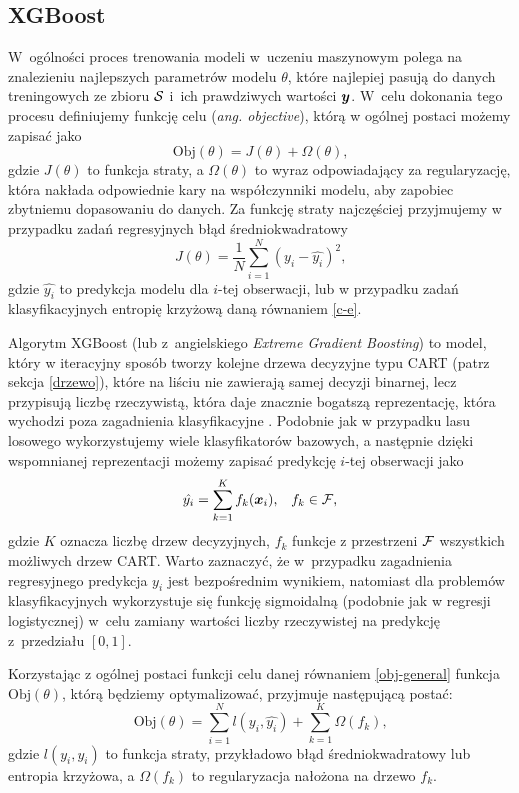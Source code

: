 \documentclass[inzynierska]{pwr_wmat_praca_dyplomowa}
\theoremstyle{plain}
\numberwithin{theorem}{chapter}
\theoremstyle{definition}
\numberwithin{theorem}{chapter}
\begin{document}
\subsection{XGBoost}
W~ogólności proces trenowania modeli w~uczeniu maszynowym polega na znalezieniu najlepszych parametrów modelu $\theta$, które najlepiej pasują do danych treningowych ze zbioru $\mathcal{S}$ i~ich prawdziwych wartości $\boldsymbol{y}$. W~celu dokonania tego procesu definiujemy funkcję celu (\textit{ang. objective}), którą w ogólnej postaci możemy zapisać jako
\begin{equation}
	\label{obj-general}
	\text{Obj}(\theta) = J(\theta) + \Omega(\theta) \text{,}
\end{equation}
gdzie $J(\theta)$ to funkcja straty, a $\Omega(\theta)$ to wyraz odpowiadający za regularyzację, która nakłada odpowiednie kary na współczynniki modelu, aby zapobiec zbytniemu dopasowaniu do danych. Za funkcję straty najczęściej przyjmujemy w przypadku zadań regresyjnych błąd średniokwadratowy
$$ J(\theta) = \frac{1}{N} \sum_{i=1}^{N} (y_i - \hat{y_i})^2 \text{,}$$
gdzie $\hat{y_i}$ to predykcja modelu dla $i$-tej obserwacji, lub w przypadku zadań klasyfikacyjnych entropię krzyżową daną równaniem \ref{c-e}.

Algorytm XGBoost (lub z~angielskiego \textit{Extreme Gradient Boosting}) to model, który w iteracyjny sposób tworzy kolejne drzewa decyzyjne typu CART (patrz sekcja \ref{drzewo}), które na liściu nie zawierają samej decyzji binarnej, lecz przypisują liczbę rzeczywistą, która daje znacznie bogatszą reprezentację, która wychodzi poza zagadnienia klasyfikacyjne \cite{xgboost}. Podobnie jak w przypadku lasu losowego wykorzystujemy wiele klasyfikatorów bazowych, a następnie dzięki wspomnianej reprezentacji możemy zapisać predykcję $i$-tej obserwacji jako
$$ \hat{y_i} = \sum_{k=1}^K f_k(\boldsymbol{x}_i) \text{,} \quad f_k \in \mathcal{F} \text{,} $$
gdzie $K$ oznacza liczbę drzew decyzyjnych, $f_k$ funkcje z przestrzeni $\mathcal{F}$ wszystkich możliwych drzew CART. Warto zaznaczyć, że w~przypadku zagadnienia regresyjnego predykcja $y_i$ jest bezpośrednim wynikiem, natomiast dla problemów klasyfikacyjnych wykorzystuje się funkcję sigmoidalną (podobnie jak w regresji logistycznej) w~celu zamiany wartości liczby rzeczywistej na predykcję z~przedziału $[0,1]$.

Korzystając z ogólnej postaci funkcji celu danej równaniem \ref{obj-general} funkcja $\text{Obj}(\theta)$, którą będziemy optymalizować, przyjmuje następującą postać:
$$ \text{Obj}(\theta) = \sum_{i=1}^{N} l(y_i, \hat{y_i}) + \sum_{k=1}^{K} \Omega(f_k) \text{,} $$
gdzie $l(y_i, \hat{y_i})$ to funkcja straty, przykładowo błąd średniokwadratowy lub entropia krzyżowa, a $\Omega(f_k)$ to regularyzacja nałożona na drzewo $f_k$.
\end{document}
